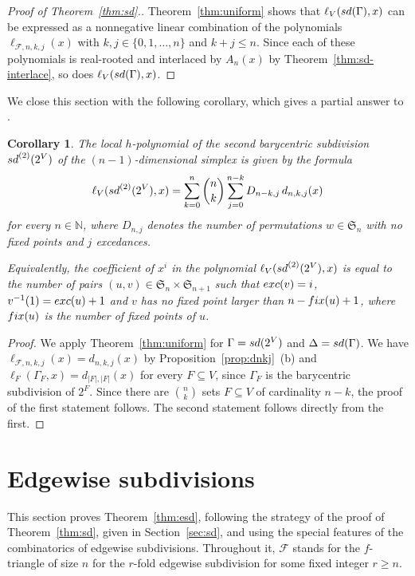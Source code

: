 \documentclass[11pt]{amsart}
\newtheorem{corollary}[theorem]{Corollary}
\newcommand{\exc}{{\rm exc}}
\newcommand{\fix}{{\rm fix}}
\newcommand{\sd}{{\rm sd}}
\newcommand{\fF}{{\mathcal F}}
\newcommand{\fS}{{\mathfrak S}}
\newcommand{\NN}{{\mathbb N}}
\begin{document}
\begin{proof}[Proof of Theorem~\ref{thm:sd}.]
Theorem~\ref{thm:uniform} shows that $\ell_V
(\sd(\Gamma),x)$ can be expressed as a nonnegative
linear combination of the polynomials 
$\ell_{\fF,n,k,j}(x)$ with $k, j \in \{0, 
1,\dots,n\}$ and $k + j \le n$. Since each of these 
polynomials is real-rooted and interlaced by 
$A_n(x)$ by Theorem~\ref{thm:sd-interlace}, so 
does $\ell_V(\sd(\Gamma),x)$.
\end{proof}

We close this section with the following corollary, 
which gives a partial answer to 
\cite[Problem~4.12]{Ath16a}.
%
\begin{corollary} \label{cor:2sd} 
The local $h$-polynomial of the second barycentric 
subdivision $\sd^{(2)}(2^V)$ of the 
$(n-1)$-dimensional simplex is given by the formula
%
\begin{equation} \label{eq:2sd}
\ell_V(\sd^{(2)}(2^V),x) = \sum_{k=0}^n {n \choose k} 
\sum_{j=0}^{n-k} D_{n-k,j} \, d_{n,k,j}(x)
\end{equation}
%
for every $n \in \NN$, where $D_{n,j}$ denotes the 
number of permutations $w \in \fS_n$ with no fixed 
points and $j$ excedances.

Equivalently, the coefficient of $x^i$ in the 
polynomial $\ell_V(\sd^{(2)}(2^V),x)$ is equal to 
the number of pairs $(u,v) \in \fS_n \times 
\fS_{n+1}$ such that $\exc(v) = i$, $v^{-1}(1) = 
\exc(u) + 1$ and $v$ has no fixed point larger than 
$n - \fix(u) + 1$, where $\fix(u)$ is the number of 
fixed points of $u$.
\end{corollary}

\begin{proof}
We apply Theorem~\ref{thm:uniform} for $\Gamma = 
\sd(2^V)$ and $\Delta = \sd(\Gamma)$. We have 
$\ell_{\fF,n,k,j}(x) = d_{n,k,j}(x)$ by  
Proposition~\ref{prop:dnkj}~(b) and 
$\ell_F(\Gamma_F,x) = d_{|F|,|F|}(x)$ for every 
$F \subseteq V$, since $\Gamma_F$ is the barycentric 
subdivision of $2^F$. Since there are ${n \choose k}$ 
sets $F \subseteq V$ of cardinality $n-k$, the 
proof of the first statement follows. The second 
statement follows directly from the first.
\end{proof}

\section{Edgewise subdivisions}
\label{sec:esd}

This section proves Theorem~\ref{thm:esd}, following 
the strategy of the proof of Theorem~\ref{thm:sd}, 
given in Section~\ref{sec:sd}, and using the special 
features of the combinatorics of edgewise subdivisions.
Throughout it, $\fF$ stands for the $f$-triangle of 
size $n$ for the $r$-fold edgewise subdivision for 
some fixed integer $r \ge n$. 
\end{document}
